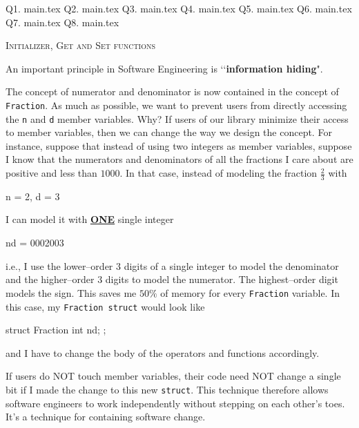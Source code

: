 \newpage Q1. {main.tex}
\newpage Q2. {main.tex}
\newpage Q3. {main.tex}
\newpage Q4. {main.tex}
\newpage Q5. {main.tex}
\newpage Q6. {main.tex}
\newpage Q7. {main.tex}
\newpage Q8. {main.tex}


\newpage
\textsc{Initializer, Get and Set functions}

An important principle in Software Engineering is \lq\lq \textbf{information hiding}".

The concept of numerator and denominator is now contained in the concept of
\verb!Fraction!. As much as possible, we want to prevent users from directly
accessing the \verb!n! and \verb!d! member variables. Why? If users of our
library minimize their access to member variables, then we can change the way
we design the concept. For instance, suppose that instead of using two integers
as member variables, suppose I know that the numerators and denominators of all
the fractions I care about are positive and less than $1000$. In that case,
instead of modeling the fraction $\frac{2}{3}$ with
\begin{console}
n = 2, d = 3
\end{console}
I can model it with \textbf{\underline{ONE}} single integer
\begin{console}
nd = 0002003
\end{console}
i.e., I use the lower--order $3$ digits of a single integer to model the
denominator and the higher--order $3$ digits to model the numerator. The
highest--order digit models the sign. This saves me $50\%$ of memory for every
\verb!Fraction! variable. In this case, my \verb!Fraction struct! would look like
\begin{console}
struct Fraction
{
    int nd;
};
\end{console}
and I have to change the body of the operators and functions accordingly.

If users do NOT touch member variables, their code need NOT change a single bit
if I made the change to this new \verb!struct!. This technique therefore allows
software engineers to work independently without stepping on each other's toes.
It's a technique for containing software change.

